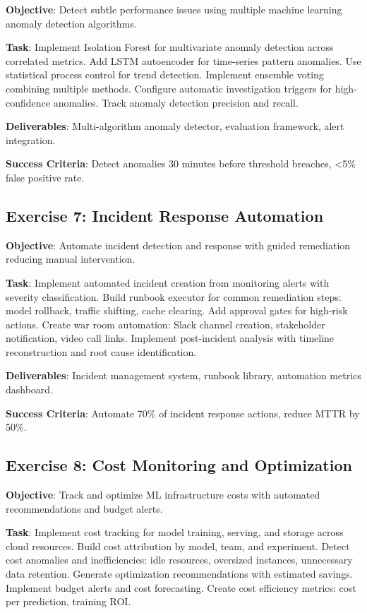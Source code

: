 \textbf{Objective}: Detect subtle performance issues using multiple machine learning anomaly detection algorithms.

\textbf{Task}: Implement Isolation Forest for multivariate anomaly detection across correlated metrics. Add LSTM autoencoder for time-series pattern anomalies. Use statistical process control for trend detection. Implement ensemble voting combining multiple methods. Configure automatic investigation triggers for high-confidence anomalies. Track anomaly detection precision and recall.

\textbf{Deliverables}: Multi-algorithm anomaly detector, evaluation framework, alert integration.

\textbf{Success Criteria}: Detect anomalies 30 minutes before threshold breaches, <5\% false positive rate.

\subsection{Exercise 7: Incident Response Automation}

\textbf{Objective}: Automate incident detection and response with guided remediation reducing manual intervention.

\textbf{Task}: Implement automated incident creation from monitoring alerts with severity classification. Build runbook executor for common remediation steps: model rollback, traffic shifting, cache clearing. Add approval gates for high-risk actions. Create war room automation: Slack channel creation, stakeholder notification, video call links. Implement post-incident analysis with timeline reconstruction and root cause identification.

\textbf{Deliverables}: Incident management system, runbook library, automation metrics dashboard.

\textbf{Success Criteria}: Automate 70\% of incident response actions, reduce MTTR by 50\%.

\subsection{Exercise 8: Cost Monitoring and Optimization}

\textbf{Objective}: Track and optimize ML infrastructure costs with automated recommendations and budget alerts.

\textbf{Task}: Implement cost tracking for model training, serving, and storage across cloud resources. Build cost attribution by model, team, and experiment. Detect cost anomalies and inefficiencies: idle resources, oversized instances, unnecessary data retention. Generate optimization recommendations with estimated savings. Implement budget alerts and cost forecasting. Create cost efficiency metrics: cost per prediction, training ROI.

